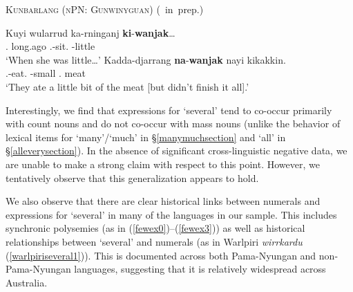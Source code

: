 \documentclass[12pt,egregdoesnotlikesansseriftitles]{scrartcl}
\begin{document}
\begin{exe}
  \ex\label{ex:lil} \textsc{Kunbarlang (nPN: Gunwinyguan)} \hfill (\citeauthor{ikthesis}~in~prep.)
  \begin{xlist}
    \ex \gll Kuyi wularrud ka-rninganj \textbf{ki}-\textbf{wanjak}\ldots\\
    \Nm.\Cliv{} long.ago \Tsg.\Nfut-sit.\Pst{} \Clii-little\\
    \glt `When she was little\ldots' %
    \ex \gll Kadda-djarrang \textbf{na}-\textbf{wanjak} nayi kikakkin.\\
    \Tpl.\Nfut-eat.\Pst{} \Cli-small \Nm.\Cli{} meat\\
    \glt `They ate a little bit of the meat [but didn't finish it all].' %
  \end{xlist}
\end{exe}

Interestingly, we find that expressions for `several' tend to co-occur primarily with count nouns and do not co-occur with mass nouns (unlike the behavior of lexical items for `many'/`much' in \S\ref{manymuchsection} and `all' in \S\ref{alleverysection}). In the absence of significant cross-linguistic negative data, we are unable to make a strong claim with respect to this point. However, we tentatively observe that this generalization appears to hold.


We also observe that there are clear historical links between numerals and expressions for `several' in many of the languages in our sample. This includes synchronic polysemies (as in (\ref{fewex0})--(\ref{fewex3})) as well as historical relationships between `several' and numerals (as in Warlpiri \textit{wirrkardu} (\ref{warlpiriseveral1})). This is documented across both Pama-Nyungan and non-Pama-Nyungan languages, suggesting that it is relatively widespread across Australia.
\end{document}
